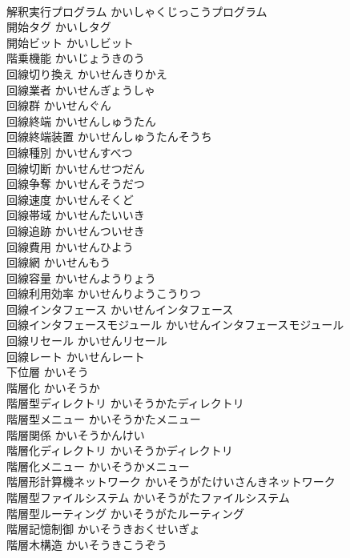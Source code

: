 \documentclass[8pt]{extreport}
\begin{document}
\begin{CJK}{UTF8}{min}
\\	解釈実行プログラム	かいしゃくじっこうプログラム	
\\	開始タグ	かいしタグ	
\\	開始ビット	かいしビット	
\\	階乗機能	かいじょうきのう	
\\	回線切り換え	かいせんきりかえ	
\\	回線業者	かいせんぎょうしゃ	
\\	回線群	かいせんぐん	
\\	回線終端	かいせんしゅうたん	
\\	回線終端装置	かいせんしゅうたんそうち	
\\	回線種別	かいせんすべつ	
\\	回線切断	かいせんせつだん	
\\	回線争奪	かいせんそうだつ	
\\	回線速度	かいせんそくど	
\\	回線帯域	かいせんたいいき	
\\	回線追跡	かいせんついせき	
\\	回線費用	かいせんひよう	
\\	回線網	かいせんもう	
\\	回線容量	かいせんようりょう	
\\	回線利用効率	かいせんりようこうりつ	
\\	回線インタフェース	かいせんインタフェース	
\\	回線インタフェースモジュール	かいせんインタフェースモジュール	
\\	回線リセール	かいせんリセール	
\\	回線レート	かいせんレート	
\\	下位層	かいそう	
\\	階層化	かいそうか	
\\	階層型ディレクトリ	かいそうかたディレクトリ	
\\	階層型メニュー	かいそうかたメニュー	
\\	階層関係	かいそうかんけい	
\\	階層化ディレクトリ	かいそうかディレクトリ	
\\	階層化メニュー	かいそうかメニュー	
\\	階層形計算機ネットワーク	かいそうがたけいさんきネットワーク	
\\	階層型ファイルシステム	かいそうがたファイルシステム	
\\	階層型ルーティング	かいそうがたルーティング	
\\	階層記憶制御	かいそうきおくせいぎょ	
\\	階層木構造	かいそうきこうぞう	

\end{CJK}
\end{document}

